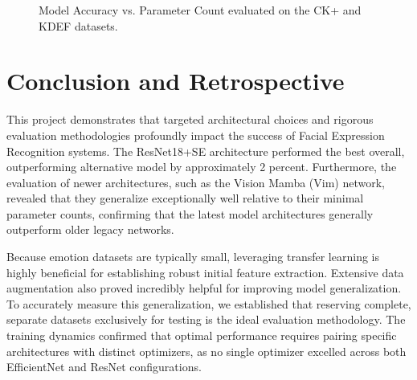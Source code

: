 \begin{figure}
\caption{Model Accuracy vs. Parameter Count evaluated on the CK+ and KDEF datasets.}
\label{fig:accuracy_vs_params}
\end{figure}

\section{Conclusion and Retrospective}

This project demonstrates that targeted architectural choices and rigorous evaluation methodologies profoundly impact the success of Facial Expression Recognition systems. The ResNet18+SE architecture performed the best overall, outperforming alternative model by approximately 2 percent. Furthermore, the evaluation of newer architectures, such as the Vision Mamba (Vim) network, revealed that they generalize exceptionally well relative to their minimal parameter counts, confirming that the latest model architectures generally outperform older legacy networks.

Because emotion datasets are typically small, leveraging transfer learning is highly beneficial for establishing robust initial feature extraction. Extensive data augmentation also proved incredibly helpful for improving model generalization. To accurately measure this generalization, we established that reserving complete, separate datasets exclusively for testing is the ideal evaluation methodology. The training dynamics confirmed that optimal performance requires pairing specific architectures with distinct optimizers, as no single optimizer excelled across both EfficientNet and ResNet configurations.

